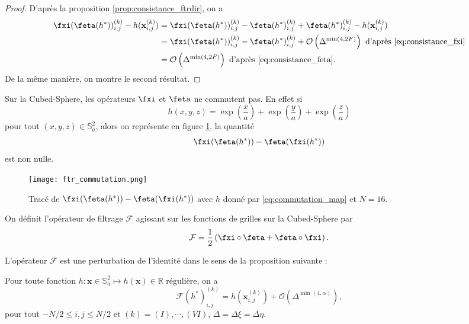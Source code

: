\begin{proof}
D'après la proposition \ref{prop:consistance_ftrdir}, on a
\begin{align*}
\fxi(\feta (h^*) )_{i,j}^{(k)} - h(\mathbf{x}_{i,j}^{(k)}) & = \fxi(\feta (h^*) )_{i,j}^{(k)} - \feta(h^*)_{i,j}^{(k)} + \feta(h^*)_{i,j}^{(k)} - h(\mathbf{x}_{i,j}^{(k)})\\
	& = \fxi(\feta (h^*) )_{i,j}^{(k)} - \feta(h^*)_{i,j}^{(k)} + \mathcal{O} \left( \Delta^{\min(4,2F)} \right) \text{ d'après \eqref{eq:consistance_fxi}}\\
	& = \mathcal{O} \left( \Delta^{\min(4,2F)} \right) \text{ d'après \eqref{eq:consistance_feta}}.
\end{align*}
De la même manière, on montre le second résultat.
\end{proof}

Sur la Cubed-Sphere, les opérateurs $\fxi$ et $\feta$ ne commutent pas. En effet si 
\begin{equation}
h(x,y,z) = \exp \left( \dfrac{x}{a} \right) + \exp \left( \dfrac{y}{a} \right) + \exp \left( \dfrac{z}{a} \right)
\label{eq:commutation_map}
\end{equation}
pour tout $(x,y,z) \in \mathbb{S}_a^2$, alors on représente en figure \ref{fig:commutation_map}, la quantité
\begin{equation}
\fxi (\feta(h^*))-\feta (\fxi(h^*))
\end{equation}
est non nulle.
\begin{figure}[htbp]
\begin{center}
\texttt{[image: ftr\_commutation.png]}
\end{center}
\caption{Tracé de $\fxi (\feta(h^*))-\feta (\fxi (h^*))$ avec $h$ donné par \eqref{eq:commutation_map} et $N=16$.}
\label{fig:commutation_map}
\end{figure}
On définit l'opérateur de filtrage $\mathcal{F}$ agissant sur les fonctions de grilles sur la Cubed-Sphere par
\begin{equation}
\mathcal{F} = \dfrac{1}{2} \left( \fxi \circ \feta + \feta \circ \fxi \right).
\label{eq:operateur_filtrage}
\end{equation}

L'opérateur $\mathcal{F}$ est une perturbation de l'identité dans le sens de la proposition suivante :
\begin{proposition}
Pour toute fonction $h : \mathbf{x} \in \mathbb{S}_a^2 \mapsto h(\mathbf{x}) \in \mathbb{R}$ régulière, on a 
\begin{equation}
\mathcal{F}(h^*)_{i,j}^{(k)} = h(\mathbf{x}_{i,j}^{(k)}) + \mathcal{O}\left( \Delta^{\min(4,\alpha)} \right),
\end{equation}
pour tout $-N/2 \leq i,j \leq N/2$ et $(k) = (I), \cdots , (VI)$, $\Delta = \Delta \xi = \Delta \eta$.
\end{proposition}


